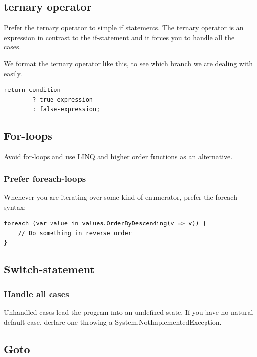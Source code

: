 \documentclass[11pt,a4paper]{article}
\begin{document}
\subsection{ternary operator}

Prefer the ternary operator to simple if statements. The ternary operator is an expression in contrast to the if-statement and it forces you to handle all the cases.

We format the ternary operator like this, to see which branch we are dealing with easily.

\begin{lstlisting}[language={[Sharp]C}, caption={ternary operator}]
    return condition
        ? true-expression
        : false-expression;
\end{lstlisting}

\subsection{For-loops}

Avoid for-loops and use LINQ and higher order functions as an alternative.

\subsubsection{Prefer foreach-loops}

Whenever you are iterating over some kind of enumerator, prefer the foreach syntax:

\begin{lstlisting}[language={[Sharp]C}, caption={foreach-loop}]
foreach (var value in values.OrderByDescending(v => v)) {
    // Do something in reverse order
}
\end{lstlisting}

\subsection{Switch-statement}

\subsubsection{Handle all cases}

Unhandled cases lead the program into an undefined state. If you have no natural default case, declare one throwing a System.NotImplementedException.

\subsection{Goto}
\end{document}
